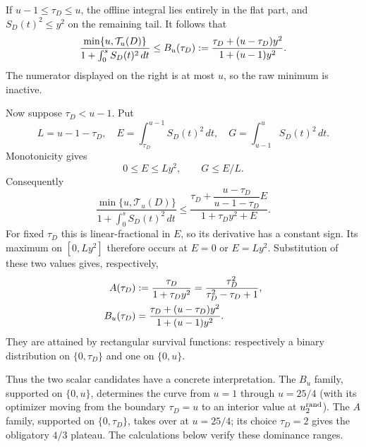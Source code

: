 If $u-1\le\tau_D\le u$, the offline integral lies entirely in the flat part,
and $S_D(t)^2\le y^2$ on the remaining tail.  It follows that
\begin{equation}
 \frac{\min\{u,\mathcal T_u(D)\}}
      {1+\int_0^sS_D(t)^2\,dt}
 \le
 B_u(\tau_D)
 \mathrel{:=}
 \frac{\tau_D+(u-\tau_D)y^2}{1+(u-1)y^2}.
 \label{eq:rcu-B-first}
\end{equation}
The numerator displayed on the right is at most $u$, so the raw minimum is
inactive.

Now suppose $\tau_D<u-1$.  Put
\begin{equation}
 L=u-1-\tau_D,
 \quad E=\int_{\tau_D}^{u-1}S_D(t)^2\,dt,
 \quad G=\int_{u-1}^uS_D(t)^2\,dt.
 \label{eq:rcu-EG}
\end{equation}
Monotonicity gives
\begin{equation}
 0\le E\le Ly^2,
 \qquad G\le E/L.
 \label{eq:rcu-E-range}
\end{equation}
Consequently
\begin{equation}
 \frac{\min\{u,\mathcal T_u(D)\}}
      {1+\int_0^sS_D(t)^2\,dt}
 \le
 \frac{\tau_D+\dfrac{u-\tau_D}{u-1-\tau_D}E}
      {1+\tau_D y^2+E}.
 \label{eq:rcu-linear-fractional-E}
\end{equation}
For fixed $\tau_D$ this is linear-fractional in $E$, so its derivative has a
constant sign.  Its maximum on $[0,Ly^2]$ therefore occurs at $E=0$ or
$E=Ly^2$.  Substitution of these two values gives, respectively,
\begin{align}
 A(\tau_D)&\mathrel{:=}\frac{\tau_D}{1+\tau_D y^2}
              =\frac{\tau_D^2}{\tau_D^2-\tau_D+1},
 \label{eq:rcu-A}\\
 B_u(\tau_D)&=\frac{\tau_D+(u-\tau_D)y^2}{1+(u-1)y^2}.
 \label{eq:rcu-B}
\end{align}
They are attained by rectangular survival functions: respectively a binary
distribution on $\{0,\tau_D\}$ and one on $\{0,u\}$.

Thus the two scalar candidates have a concrete interpretation.  The
$B_u$ family, supported on $\{0,u\}$, determines the curve from $u=1$
through $u=25/4$ (with its optimizer moving from the boundary
$\tau_D=u$ to an interior value at $u_{2}^{\mathrm{rand}}$).  The $A$ family, supported
on $\{0,\tau_D\}$, takes over at $u=25/4$; its choice
$\tau_D=2$ gives the obligatory $4/3$ plateau.  The calculations below
verify these dominance ranges.

